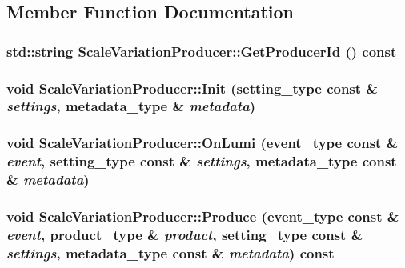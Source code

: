 \subsection{Member Function Documentation}
\hypertarget{classScaleVariationProducer_aaab35f39c99ffe1d15d5fda78c065e26}{
\subsubsection[{GetProducerId}]{\setlength{\rightskip}{0pt plus 5cm}std::string ScaleVariationProducer::GetProducerId () const}}
\label{classScaleVariationProducer_aaab35f39c99ffe1d15d5fda78c065e26}
\hypertarget{classScaleVariationProducer_a32faff7a649574b05193c921bebe8542}{
\subsubsection[{Init}]{\setlength{\rightskip}{0pt plus 5cm}void ScaleVariationProducer::Init (setting\_\-type const \& {\em settings}, \/  metadata\_\-type \& {\em metadata})}}
\label{classScaleVariationProducer_a32faff7a649574b05193c921bebe8542}
\hypertarget{classScaleVariationProducer_a8707e303a185f866fb84e990190e2029}{
\subsubsection[{OnLumi}]{\setlength{\rightskip}{0pt plus 5cm}void ScaleVariationProducer::OnLumi (event\_\-type const \& {\em event}, \/  setting\_\-type const \& {\em settings}, \/  metadata\_\-type const \& {\em metadata})}}
\label{classScaleVariationProducer_a8707e303a185f866fb84e990190e2029}
\hypertarget{classScaleVariationProducer_a065fd728acd12ae448a7ce1d7088bdae}{
\subsubsection[{Produce}]{\setlength{\rightskip}{0pt plus 5cm}void ScaleVariationProducer::Produce (event\_\-type const \& {\em event}, \/  product\_\-type \& {\em product}, \/  setting\_\-type const \& {\em settings}, \/  metadata\_\-type const \& {\em metadata}) const}}
\label{classScaleVariationProducer_a065fd728acd12ae448a7ce1d7088bdae}


